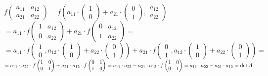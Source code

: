 \documentclass[a4paper,12pt]{article}
\newcommand*{\hm}[1]{#1\nobreak\discretionary{}
	{\hbox{$\mathsurround=0pt #1$}}{}}
\begin{document}
$f\begin{pmatrix}
a_{11}&a_{12}\\
a_{21}&a_{22}
\end{pmatrix}=f\left(a_{11}\cdot \begin{pmatrix}
1\\0
\end{pmatrix}+a_{21}\cdot \begin{pmatrix}
0\\1
\end{pmatrix}, \begin{matrix}
a_{12}\\a_{22}
\end{matrix}\right)=$\\$=a_{11}\cdot f\begin{pmatrix}
1&a_{12}\\
0&a_{22}
\end{pmatrix}+a_{21}\cdot f\begin{pmatrix}
0&a_{12}\\
1&a_{22}
\end{pmatrix}=$\\$=a_{11}\cdot f\left(\begin{matrix}
1\\0
\end{matrix}, a_{12}\cdot \begin{pmatrix}
1\\0
\end{pmatrix}+a_{22}\cdot \begin{pmatrix}
0\\1
\end{pmatrix} \right)+a_{21}\cdot f\left(\begin{matrix}
0\\1
\end{matrix}, a_{12}\cdot \begin{pmatrix}
1\\0
\end{pmatrix}+a_{22}\cdot \begin{pmatrix}
0\\1
\end{pmatrix} \right)=$\\$=a_{11}\cdot a_{22}\cdot f\begin{pmatrix}
1&0\\
0&1
\end{pmatrix}+a_{21}\cdot a_{12}\cdot f\begin{pmatrix}
0&1\\
1&0
\end{pmatrix}=a_{11}\cdot a_{22}-a_{21}\cdot a_{12}\cdot f\begin{pmatrix}
1&0\\
0&1
\end{pmatrix}\hm{=}a_{11}\cdot a_{22}-a_{21}\cdot a_{12}=\det A$
\end{document}
